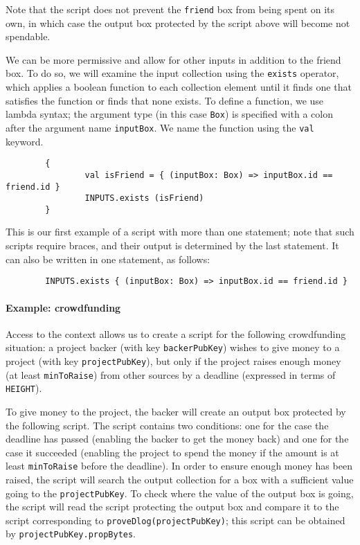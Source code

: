 \documentclass[11pt]{article}
\begin{document}
Note that the script does not prevent the \texttt{friend} box from being spent on its own, in which case the output box protected by the script above will become not spendable.

We can be more permissive and allow for other inputs in addition to the friend box. To do so, we will examine the input collection using the \texttt{exists} operator, which applies a boolean function to each collection element until it finds one that satisfies the function or finds that none exists. To define a function, we use lambda syntax; the argument type (in this case \texttt{Box}) is specified with a colon after the argument name \texttt{inputBox}. We name the function using the \texttt{val} keyword.
\begin{verbatim}
        {
                val isFriend = { (inputBox: Box) => inputBox.id == friend.id }
                INPUTS.exists (isFriend)
        }
\end{verbatim}

This is our first example of a script with more than one statement; note that such scripts require braces, and their output is determined by the last statement.
It can also be written in one statement, as follows:
\begin{verbatim}
        INPUTS.exists { (inputBox: Box) => inputBox.id == friend.id }
\end{verbatim}


\paragraph{Example: crowdfunding}
Access to the context allows us to create a script for the following crowdfunding situation: a project backer (with key  \texttt{backerPubKey}) wishes to give money to a project (with key \texttt{projectPubKey}), but only if the project raises enough money (at least \texttt{minToRaise}) from other sources by a deadline (expressed in terms of \texttt{HEIGHT}). 

To give money to the project, the backer will create an output box protected by the following script. The script contains two conditions: one for the case the deadline has passed (enabling the backer to get the money back) and one for the case it succeeded (enabling the project to spend the money if the amount is at least \texttt{minToRaise} before the deadline).  In order to ensure enough money has been raised, the script will search the output collection for a box with a sufficient value going to the \texttt{projectPubKey}. To check where the value of the output box is going, the script will read the script protecting the output box and compare it to the script corresponding to \texttt{proveDlog(projectPubKey)}; this script can be obtained by \texttt{projectPubKey.propBytes}.
\end{document}
